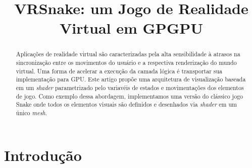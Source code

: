 \documentclass[conference]{IEEEtran}
\begin{document}
\title{VRSnake: um Jogo de Realidade Virtual em GPGPU}


\author{}



\maketitle

\begin{abstract}
Aplicações de realidade virtual são caracterizadas pela alta sensibilidade à atrasos na sincronização entre os movimentos do usuário e a respectiva renderização do mundo virtual. Uma forma de acelerar a execução da camada lógica é transportar sua implementação para GPU.  Este artigo propõe uma arquitetura de visualização baseada em um \textit{shader} parametrizado pelo variavéis de estados e movimentações dos elementos de jogo. Como exemplo dessa abordagem, implementamos uma versão do clássico jogo Snake onde todos os elementos visuais são definidos e desenhados via \textit{shader} em um único \textit{mesh}.
\end{abstract}


\IEEEpeerreviewmaketitle

\section{Introdução} \label{sec:introduction}
\end{document}
